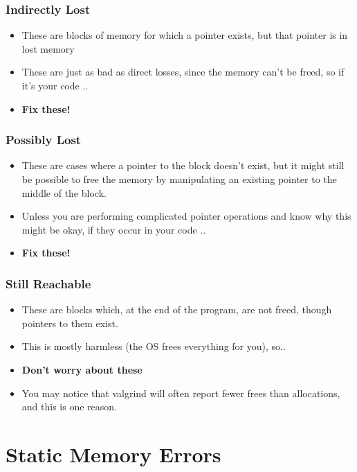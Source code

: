 \documentclass{beamer}
\begin{document}
\begin{frame}[fragile]
\frametitle{Indirectly Lost}
\begin{itemize}
\item These are blocks of memory for which a pointer exists, but that pointer is in lost memory
\item These are just as bad as direct losses, since the memory can't be freed, so if it's your code ..
\item \textbf{Fix these!}
\end{itemize}
\end{frame}

\begin{frame}[fragile]
\frametitle{Possibly Lost}
\begin{itemize}
\item These are cases where a pointer to the block doesn't exist, but it might still be possible to free the memory by manipulating an existing pointer to the middle of the block.
\item Unless you are performing complicated pointer operations and know why this might be okay, if they occur in your code ..
\item \textbf{Fix these!}
\end{itemize}
\end{frame}

\begin{frame}[fragile]
\frametitle{Still Reachable}
\begin{itemize}
\item These are blocks which, at the end of the program, are not freed, though pointers to them exist.
\item This is mostly harmless (the OS frees everything for you), so..
\item \textbf{Don't worry about these}
  \item You may notice that valgrind will often report fewer frees than allocations, and this is one reason. 
\end{itemize}
\end{frame}

\section{Static Memory Errors}
\end{document}
